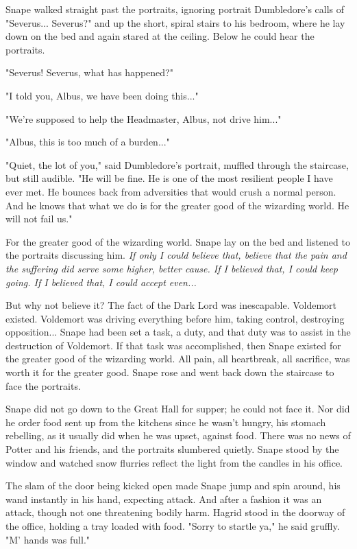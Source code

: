 Snape walked straight past the portraits, ignoring portrait Dumbledore's calls of "Severus... Severus?" and up the short, spiral stairs to his bedroom, where he lay down on the bed and again stared at the ceiling. Below he could hear the portraits.

"Severus! Severus, what has happened?"

"I told you, Albus, we have been doing this..."

"We're supposed to help the Headmaster, Albus, not drive him..."

"Albus, this is too much of a burden..."

"Quiet, the lot of you," said Dumbledore's portrait, muffled through the staircase, but still audible. "He will be fine. He is one of the most resilient people I have ever met. He bounces back from adversities that would crush a normal person. And he knows that what we do is for the greater good of the wizarding world. He will not fail us."

For the greater good of the wizarding world. Snape lay on the bed and listened to the portraits discussing him. \emph{If only I could believe that, believe that the pain and the suffering did serve some higher, better cause. If I believed that, I could keep going. If I believed that, I could accept even...}

But why not believe it? The fact of the Dark Lord was inescapable. Voldemort existed. Voldemort was driving everything before him, taking control, destroying opposition... Snape had been set a task, a duty, and that duty was to assist in the destruction of Voldemort. If that task was accomplished, then Snape existed for the greater good of the wizarding world. All pain, all heartbreak, all sacrifice, was worth it for the greater good. Snape rose and went back down the staircase to face the portraits.

\sbreak

Snape did not go down to the Great Hall for supper; he could not face it. Nor did he order food sent up from the kitchens since he wasn't hungry, his stomach rebelling, as it usually did when he was upset, against food. There was no news of Potter and his friends, and the portraits slumbered quietly. Snape stood by the window and watched snow flurries reflect the light from the candles in his office.

The slam of the door being kicked open made Snape jump and spin around, his wand instantly in his hand, expecting attack. And after a fashion it was an attack, though not one threatening bodily harm. Hagrid stood in the doorway of the office, holding a tray loaded with food. "Sorry to startle ya," he said gruffly. "M' hands was full."

